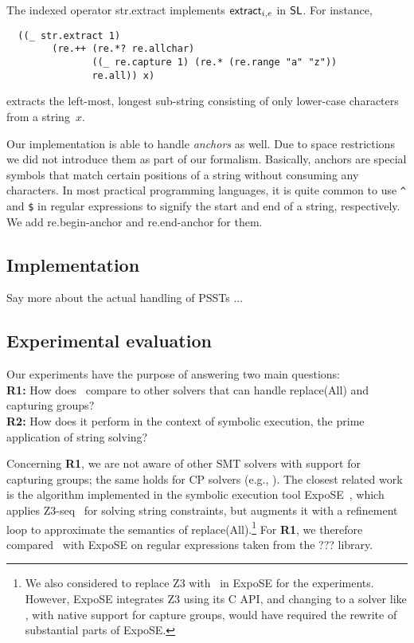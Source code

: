 The indexed operator {\sf str.extract} implements $\mathsf{extract}_{i, e}$ in
$\mathsf{SL}$. For instance,
%
\begin{verbatim}
  ((_ str.extract 1)
        (re.++ (re.*? re.allchar)
               ((_ re.capture 1) (re.* (re.range "a" "z"))
               re.all)) x)
\end{verbatim}
%
extracts the left-most, longest sub-string consisting of only lower-case
characters from a string~$x$.

Our implementation is able to handle \textit{anchors} as well. Due to space restrictions we did not introduce them as part of our formalism. Basically, anchors are special symbols that match certain positions of a string without consuming any characters. In most practical programming languages, it is quite common to use \verb!^! and \verb!$! in regular expressions to signify the start and end of a string, respectively. We add \textsf{re.begin-anchor} and \textsf{re.end-anchor} for them.

\subsection{Implementation}

Say more about the actual handling of PSSTs ...

\subsection{Experimental evaluation}

Our experiments have the purpose of answering two main questions:\\
\textbf{R1:} How does \ostrich\ compare to
other solvers
that can handle replace(All) and capturing groups?\\
\textbf{R2:} How does it perform in the context of symbolic execution,
the prime application of string solving?

Concerning \textbf{R1}, we are not aware of other SMT solvers with
support for capturing groups; the same holds for CP solvers (e.g.,
\cite{DBLP:conf/cpaior/ScottFPS17,DBLP:conf/cp/AmadiniGS20}). The
closest related work is the algorithm implemented in the symbolic
execution tool ExpoSE~\cite{DBLP:conf/spin/LoringMK17,LMK19}, which
applies Z3-seq~\cite{Z3} for solving string constraints, but augments
it with a refinement loop to approximate the semantics of
replace(All).\footnote{We also considered to replace Z3 with \ostrich\
  in ExpoSE for the experiments. However, ExpoSE integrates Z3 using
  its C API, and changing to a solver like \ostrich, with native
  support for capture groups, would have required the rewrite of
  substantial parts of ExpoSE.}
%
For \textbf{R1}, we therefore compared \ostrich\ with ExpoSE on
regular expressions taken from the ??? library.
